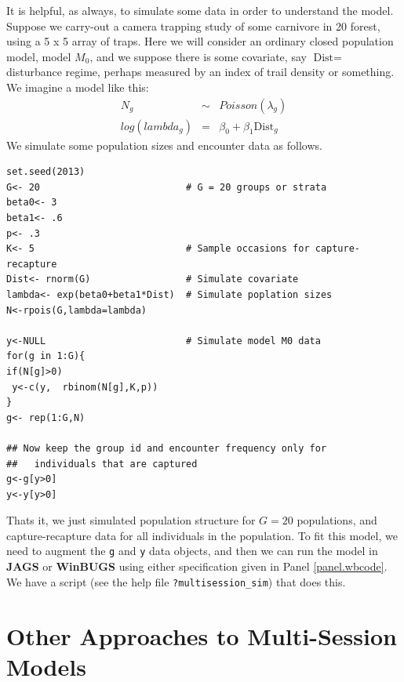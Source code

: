 It is helpful, as always, to simulate some data in order to understand
the model. Suppose we carry-out a camera trapping study of some
carnivore in 20 forest, using a 5 x 5 array of traps. Here we will
consider an ordinary closed population model, model $M_0$, and we
suppose there is 
some covariate, say $\mbox{Dist} = $ disturbance regime, perhaps measured by an
index of trail density or something.
We imagine a model like this:
\begin{eqnarray*}
N_{g} &\sim& Poisson(\lambda_{g})  \\
log(lambda_{g})& = &\beta_{0} + \beta_{1} \mbox{Dist}_{g} 
\end{eqnarray*}
We simulate some population sizes and encounter data  as
follows.
\begin{verbatim}
set.seed(2013)
G<- 20                          # G = 20 groups or strata
beta0<- 3
beta1<- .6
p<- .3
K<- 5                           # Sample occasions for capture-recapture
Dist<- rnorm(G)                 # Simulate covariate
lambda<- exp(beta0+beta1*Dist)  # Simulate poplation sizes 
N<-rpois(G,lambda=lambda)

y<-NULL                         # Simulate model M0 data
for(g in 1:G){
if(N[g]>0)
 y<-c(y,  rbinom(N[g],K,p))
}
g<- rep(1:G,N)

## Now keep the group id and encounter frequency only for
##   individuals that are captured 
g<-g[y>0]
y<-y[y>0]
\end{verbatim}
Thats it,
we just simulated population structure for $G=20$ populations, and
capture-recapture data for all individuals in the population. To fit
this model, we need to augment the \mbox{\tt g} and \mbox{\tt y} data
objects, and then we can run the model in {\bf JAGS} or {\bf WinBUGS}
using either specification given in Panel \ref{panel.wbcode}.
We have a script (see the help file \mbox{\tt ?multisession\_sim})
that does this.



\section{Other Approaches to Multi-Session Models}


